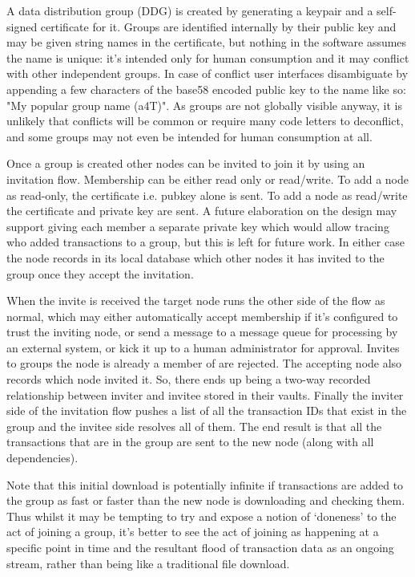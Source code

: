 \documentclass{article}
\begin{document}
A data distribution group (DDG) is created by generating a keypair and a self-signed certificate for it. Groups are
identified internally by their public key and may be given string names in the certificate, but nothing in the
software assumes the name is unique: it's intended only for human consumption and it may conflict with other
independent groups. In case of conflict user interfaces disambiguate by appending a few characters of the base58
encoded public key to the name like so:  "My popular group name (a4T)". As groups are not globally visible anyway,
it is unlikely that conflicts will be common or require many code letters to deconflict, and some groups may not
even be intended for human consumption at all.

Once a group is created other nodes can be invited to join it by using an invitation flow. Membership can be either
read only or read/write. To add a node as read-only, the certificate i.e. pubkey alone is sent. To add a node as
read/write the certificate and private key are sent. A future elaboration on the design may support giving each
member a separate private key which would allow tracing who added transactions to a group, but this is left for
future work. In either case the node records in its local database which other nodes it has invited to the group
once they accept the invitation.

When the invite is received the target node runs the other side of the flow as normal, which may either
automatically accept membership if it's configured to trust the inviting node, or send a message to a message queue
for processing by an external system, or kick it up to a human administrator for approval. Invites to groups the
node is already a member of are rejected. The accepting node also records which node invited it. So, there ends up
being a two-way recorded relationship between inviter and invitee stored in their vaults. Finally the inviter side
of the invitation flow pushes a list of all the transaction IDs that exist in the group and the invitee side
resolves all of them. The end result is that all the transactions that are in the group are sent to the new node
(along with all dependencies).

Note that this initial download is potentially infinite if transactions are added to the group as fast or faster
than the new node is downloading and checking them. Thus whilst it may be tempting to try and expose a notion of
`doneness' to the act of joining a group, it's better to see the act of joining as happening at a specific point in
time and the resultant flood of transaction data as an ongoing stream, rather than being like a traditional file
download.
\end{document}
